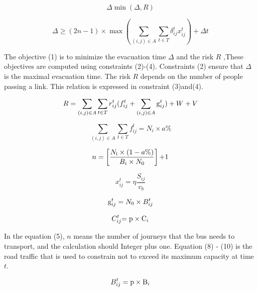 \documentclass{mcmthesis}
\begin{document}
\begin{equation}\label{3}
\Delta \min (\Delta ,R)
\end{equation}

\begin{equation}\label{4}
\Delta  \ge (2n - 1) \times \max (\sum\limits_{(i,j) \in A} {\sum\limits_{t \in T} {\delta _{ij}^tx_{ij}^t} } ) + \Delta t
\end{equation}

The objective (1) is to minimize the evacuation time $\Delta $ and the risk $R$ ,These objectives are computed using constraints (2)-(4). Constraints (2) ensure that $\Delta $ is the maximal evacuation time. The risk $R$ depends on the number of people passing a link. This relation is expressed in constraint (3)and(4).

\begin{equation}\label{5}
 R = \sum\limits_{(i,j) \in A} {\sum\limits_{t \in T} {r_{ij}^t} } (f_{ij}^t + \sum\limits_{(i,j) \in A} {{\rm{g}}_{ij}^t} ) + W + V
\end{equation}

\begin{equation}\label{6}
\sum\limits_{(i,j) \in A} {\sum\limits_{t \in T} {f_{ij}^t} }  = {N_i} \times a\%
\end{equation}

\begin{equation}\label{7}
n = \left[ {\frac{{{N_{\rm{i}}} \times (1 - a\% )}}{{{B_i} \times {N_0}}}} \right]{\rm{ + }}1
\end{equation}

\begin{equation}\label{8}
x_{ij}^t = \eta \frac{{{S_{ij}}}}{{{v_b}}}
\end{equation}

\begin{equation}\label{9}
{\rm{g}}_{ij}^t = {N_0} \times B_{ij}^t
\end{equation}

\begin{equation}\label{10}
C_{ij}^t{\rm{ = p}} \times {{\rm{C}}_i}
\end{equation}

In the equation (5), $n$ means the number of journeys that the bus needs to transport, and the calculation should Integer plus one. Equation (8) - (10) is the road traffic that is used to constrain not to exceed its maximum capacity at time $t$.

\begin{equation}\label{11}
B_{ij}^t = {\rm{p}} \times {{\rm{B}}_i}
\end{equation}
\end{document}
